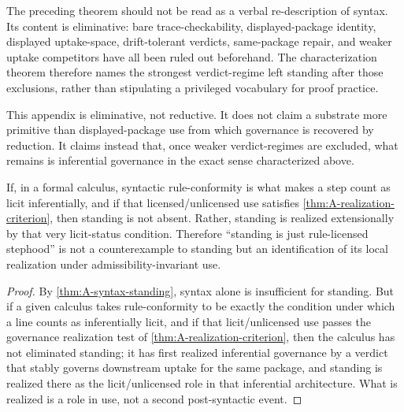 \begin{remark}
The preceding theorem should not be read as a verbal re-description of syntax. Its content is eliminative: bare trace-checkability, displayed-package identity, displayed uptake-space, drift-tolerant verdicts, same-package repair, and weaker uptake competitors have all been ruled out beforehand. The characterization theorem therefore names the strongest verdict-regime left standing after those exclusions, rather than stipulating a privileged vocabulary for proof practice.

This appendix is eliminative, not reductive. It does not claim a substrate more primitive than displayed-package use from which governance is recovered by reduction. It claims instead that, once weaker verdict-regimes are excluded, what remains is inferential governance in the exact sense characterized above.
\end{remark}

\begin{lemma}
\label{lem:A-standing-realized}
If, in a formal calculus, syntactic rule-conformity is what makes a step count as licit inferentially, and if that licensed/unlicensed use satisfies \cref{thm:A-realization-criterion}, then standing is not absent. Rather, standing is realized extensionally by that very licit-status condition. Therefore ``standing is just rule-licensed stephood'' is not a counterexample to standing but an identification of its local realization under admissibility-invariant use.
\end{lemma}

\begin{proof}
By \cref{thm:A-syntax-standing}, syntax alone is insufficient for standing. But if a given calculus takes rule-conformity to be exactly the condition under which a line counts as inferentially licit, and if that licit/unlicensed use passes the governance realization test of \cref{thm:A-realization-criterion}, then the calculus has not eliminated standing; it has first realized inferential governance by a verdict that stably governs downstream uptake for the same package, and standing is realized there as the licit/unlicensed role in that inferential architecture. What is realized is a role in use, not a second post-syntactic event.
\end{proof}

